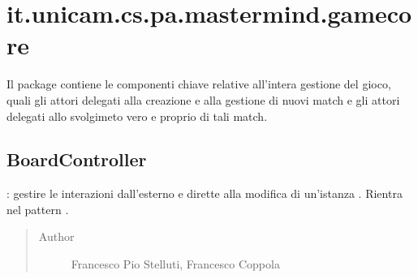 \documentclass[letterpaper,10pt,italian,openany,oneside]{sphinxmanual}
\begin{document}
\begin{fulllineitems}
\label{\detokenize{source/it/unicam/cs/pa/mastermind/factories/RandomBotMakerFactory:it.unicam.cs.pa.mastermind.factories.RandomBotMakerFactory.getName()}}
\end{fulllineitems}



\section{it.unicam.cs.pa.mastermind.gamecore}
\label{\detokenize{source/it/unicam/cs/pa/mastermind/gamecore/package-index:it-unicam-cs-pa-mastermind-gamecore}}\label{\detokenize{source/it/unicam/cs/pa/mastermind/gamecore/package-index::doc}}
Il package contiene le componenti chiave relative all’intera gestione del gioco, quali gli attori delegati alla creazione e alla gestione di nuovi match e gli attori delegati allo svolgimeto vero e proprio di tali match.

\label{\detokenize{source/it/unicam/cs/pa/mastermind/gamecore/package-index:package-it.unicam.cs.pa.mastermind.gamecore}}

\subsection{BoardController}
\label{\detokenize{source/it/unicam/cs/pa/mastermind/gamecore/BoardController:boardcontroller}}\label{\detokenize{source/it/unicam/cs/pa/mastermind/gamecore/BoardController::doc}}

\begin{fulllineitems}
\label{\detokenize{source/it/unicam/cs/pa/mastermind/gamecore/BoardController:it.unicam.cs.pa.mastermind.gamecore.BoardController}}
: gestire le interazioni dall’esterno e dirette alla modifica di un’istanza . Rientra nel pattern .
\begin{quote}\begin{description}
\item[{Author}] \leavevmode
Francesco Pio Stelluti, Francesco Coppola

\end{description}\end{quote}

\end{fulllineitems}
\end{document}
